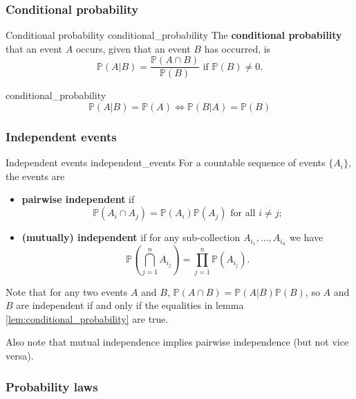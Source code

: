 \subsubsection{Conditional probability}

\begin{definition}{Conditional probability \cite{math2901_notes}}{conditional_probability}
The \textbf{conditional probability} that an event $A$ occurs, given that an event $B$ has occurred, is
$$ \mathbb{P} (A | B) = \dfrac{\mathbb{P} (A \cap B)}{\mathbb{P} (B)} \text{ if } \mathbb{P} (B) \not = 0 . $$
\end{definition}

\begin{lemma}{\cite{math2901_notes}}{conditional_probability}
$$ \mathbb{P} (A|B) = \mathbb{P} (A) \iff \mathbb{P} (B|A) = \mathbb{P} (B) $$
\end{lemma}

\subsubsection{Independent events}

\begin{definition}{Independent events \cite{math2901_notes}}{independent_events}
For a countable sequence of events $\{A_i\}$, the events are  
\begin{itemize}
	\item \textbf{pairwise independent} if
$$ \mathbb{P} (A_i \cap A_j) = \mathbb{P} (A_i) \mathbb{P} (A_j) \text{ for all } i \not = j ; $$

	\item \textbf{(mutually) independent} if for any sub-collection $A_{i_1}, \ldots, A_{i_n}$ we have
$$ \mathbb{P} \left( \bigcap_{j = 1}^n A_{i_j} \right) = \prod_{j = 1}^n \mathbb{P} (A_{i_j}) . $$
\end{itemize}
\end{definition}

Note that for any two events $A$ and $B$, $\mathbb{P} (A \cap B) = \mathbb{P} (A|B) \mathbb{P} (B)$, so $A$ and $B$ are independent if and only if the equalities in lemma \ref{lem:conditional_probability} are true.

Also note that mutual independence implies pairwise independence (but not vice versa).

\subsubsection{Probability laws}

